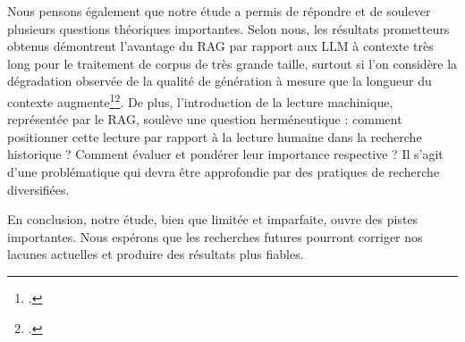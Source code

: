 \documentclass[a4paper,twoside,12pt]{book}
\begin{document}
Nous pensons également que notre étude a permis de répondre et de soulever plusieurs questions théoriques importantes. Selon nous, les résultats prometteurs obtenus démontrent l'avantage du RAG par rapport aux LLM à contexte très long pour le traitement de corpus de très grande taille, surtout si l'on considère la dégradation observée de la qualité de génération à mesure que la longueur du contexte augmente\footcite{liu2023}\footcite{hsieh2024}. De plus, l'introduction de la lecture machinique, représentée par le RAG, soulève une question herméneutique : comment positionner cette lecture par rapport à la lecture humaine dans la recherche historique ? Comment évaluer et pondérer leur importance respective ? Il s'agit d'une problématique qui devra être approfondie par des pratiques de recherche diversifiées.

En conclusion, notre étude, bien que limitée et imparfaite, ouvre des pistes importantes. Nous espérons que les recherches futures pourront corriger nos lacunes actuelles et produire des résultats plus fiables.


\printbibliography

\appendix


\backmatter

\listoffigures
\listoftables
\tableofcontents
\end{document}
